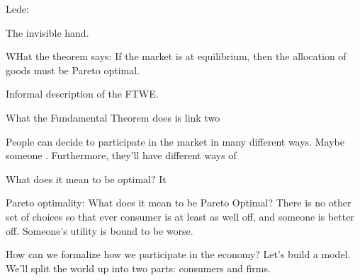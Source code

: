


Lede:

The invisible hand.

WHat the theorem says: If the market is at equilibrium, then the
allocation of goods must be Pareto optimal.

Informal description of the FTWE.

What the Fundamental Theorem does is link two 



People can decide to participate in the market in many different ways.
Maybe someone .  Furthermore, they'll have different ways of

What does it mean to be optimal?  It 

Pareto optimality: What does it mean to be Pareto Optimal?  There is
no other set of choices so that ever consumer is at least as well off,
and someone is better off.  Someone's utility is bound to be worse.



How can we formalize how we participate in the economy?  Let's build a
model.  We'll split the world up into two parts: consumers and firms.




